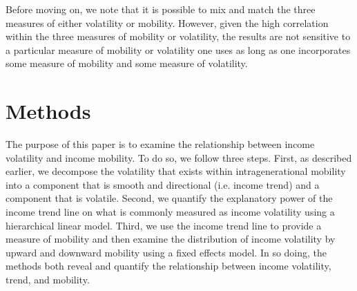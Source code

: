 \documentclass[12pt]{article}
\begin{document}
Before moving on, we note that it is possible to mix and match the three measures of either volatility or mobility. However, given the high correlation within the three measures of mobility or volatility, the results are not sensitive to a particular measure of mobility or volatility one uses as long as one incorporates some measure of mobility and some measure of volatility.

\section{Methods}

The purpose of this paper is to examine the relationship between income volatility and income mobility. To do so, we follow three steps. First, as described earlier, we decompose the volatility that exists within intragenerational mobility into a component that is smooth and directional (i.e. income trend) and a component that is volatile. Second, we quantify the explanatory power of the income trend line on what is commonly measured as income volatility using a hierarchical linear model. Third, we use the income trend line to provide a measure of mobility and then examine the distribution of income volatility by upward and downward mobility using a fixed effects model. In so doing, the methods both reveal and quantify the relationship between income volatility, trend, and mobility.
\end{document}
